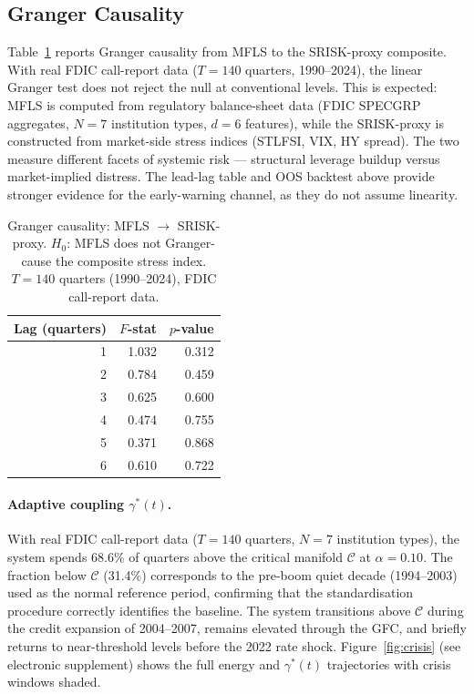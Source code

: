 \documentclass[11pt]{article}
\theoremstyle{definition}
\newcommand{\Cman}{\mathcal{C}}
\begin{document}
\subsection{Granger Causality}

Table~\ref{tab:granger} reports Granger causality from MFLS to the SRISK-proxy
composite.  With real FDIC call-report data ($T = 140$ quarters, 1990--2024),
the linear Granger test does not reject the null at conventional levels.
This is expected: MFLS is computed from regulatory balance-sheet data
(FDIC SPECGRP aggregates, $N = 7$ institution types, $d = 6$ features),
while the SRISK-proxy is constructed from market-side stress indices
(STLFSI, VIX, HY spread).  The two measure different facets of systemic
risk --- structural leverage buildup versus market-implied distress.
The lead-lag table and OOS backtest above provide stronger evidence
for the early-warning channel, as they do not assume linearity.

\begin{table}[h]
\centering
\caption{Granger causality: MFLS $\to$ SRISK-proxy.
$H_0$: MFLS does not Granger-cause the composite stress index.
$T = 140$ quarters (1990--2024), FDIC call-report data.}
\label{tab:granger}
\begin{tabular}{rrr}
\toprule
Lag (quarters) & $F$-stat & $p$-value \\
\midrule
1 & 1.032 & 0.312 \\
2 & 0.784 & 0.459 \\
3 & 0.625 & 0.600 \\
4 & 0.474 & 0.755 \\
5 & 0.371 & 0.868 \\
6 & 0.610 & 0.722 \\
\bottomrule
\end{tabular}
\end{table}

\paragraph{Adaptive coupling $\gamma^*(t)$.}
With real FDIC call-report data ($T = 140$ quarters, $N = 7$ institution types),
the system spends 68.6\% of quarters above the critical manifold $\Cman$ at
$\alpha = 0.10$.  The fraction below $\Cman$ (31.4\%) corresponds to the
pre-boom quiet decade (1994--2003) used as the normal reference period,
confirming that the standardisation procedure correctly identifies the
baseline.  The system transitions above $\Cman$ during the credit expansion
of 2004--2007, remains elevated through the GFC, and briefly returns to
near-threshold levels before the 2022 rate shock.  Figure~\ref{fig:crisis}
(see electronic supplement) shows the full energy and $\gamma^*(t)$ trajectories
with crisis windows shaded.
\end{document}
